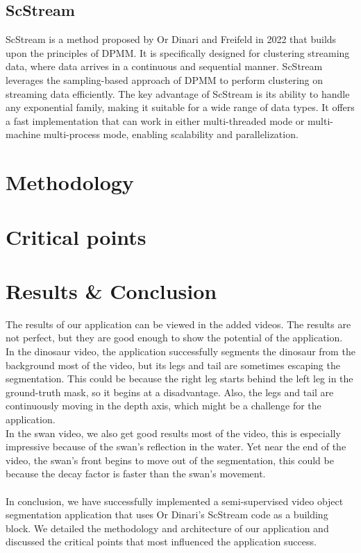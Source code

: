 \documentclass[12pt]{article}
\begin{document}
        \subsection{ScStream}\label{subsec:scstream}
ScStream is a method proposed by Or Dinari and Freifeld in 2022 that builds upon the principles of DPMM.
It is specifically designed for clustering streaming data, where data arrives in a continuous and sequential manner.
ScStream leverages the sampling-based approach of DPMM to perform clustering on streaming data efficiently.
The key advantage of ScStream is its ability to handle any exponential family, making it suitable for a wide range of data types.
It offers a fast implementation that can work in either multi-threaded mode or multi-machine multi-process mode, enabling scalability and parallelization.
\pagebreak

\section{Methodology}\label{sec:methodology}


\section{Critical points}\label{sec:critical}


\section{Results \& Conclusion}\label{sec:conclusion}
The results of our application can be viewed in the added videos.
The results are not perfect, but they are good enough to show the potential of the application. \\
In the dinosaur video, the application successfully segments the dinosaur from the background most of the video, but its legs and tail are sometimes escaping the segmentation.
This could be because the right leg starts behind the left leg in the ground-truth mask, so it begins at a disadvantage.
Also, the legs and tail are continuously moving in the depth axis, which might be a challenge for the application. \\
In the swan video, we also get good results most of the video, this is especially impressive because of the swan's reflection in the water.
Yet near the end of the video, the swan's front begins to move out of the segmentation, this could be because the decay factor is faster than the swan's movement. \\
\\
In conclusion, we have successfully implemented a semi-supervised video object segmentation application that uses Or Dinari's ScStream code as a building block.
We detailed the methodology and architecture of our application and discussed the critical points that most influenced the application success.
\end{document}
